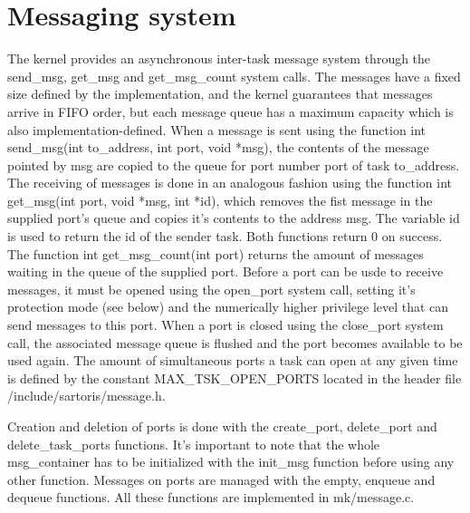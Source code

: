 \documentclass[11pt, letterpaper, twoside, english]{book}
\begin{document}
\section{Messaging system}
The kernel provides an asynchronous inter-task message system through the \textsf{send\_msg}, \textsf{get\_msg} and \textsf{get\_msg\_count} system calls. The messages have a fixed size defined by the implementation, and the kernel guarantees that messages arrive in FIFO order, but each message queue has a maximum capacity which is also implementation-defined. When a message is sent using the function \textsf{int send\_msg(int to\_address, int port, void *msg)}, the contents of the message pointed by \textsf{msg} are copied to the queue for port number \textsf{port} of task \textsf{to\_address}. The receiving of messages is done in an analogous fashion using the function \textsf{int get\_msg(int port, void *msg, int *id)}, which removes the fist message in the supplied \textsf{port}'s queue and copies it's contents to the address \textsf{msg}. The variable \textsf{id} is used to return the id of the sender task. Both functions return 0 on success. 
The function \textsf{int get\_msg\_count(int port)} returns the amount of messages waiting in the queue of the supplied port.
Before a port can be usde to receive messages, it must be opened using the \textsf{open\_port} system call, setting it's protection mode (see below) and the numerically higher privilege level that can send messages to this port. When a port is closed using the \textsf{close\_port} system call, the associated message queue is flushed and the port becomes available to be used again. The amount of simultaneous ports a task can open at any given time is defined by the constant \textsf{MAX\_TSK\_OPEN\_PORTS} located in the header file \textsf{/include/sartoris/message.h}. 

Creation and deletion of ports is done with the \textsf{create\_port}, \textsf{delete\_port} and \textsf{delete\_task\_ports} functions. It's important to note that the whole \textsf{msg\_container} has to be initialized with the \textsf{init\_msg} function before using any other function. Messages on ports are managed with the \textsf{empty}, \textsf{enqueue} and \textsf{dequeue} functions. All these functions are implemented in \textsf{mk/message.c}.
\end{document}
